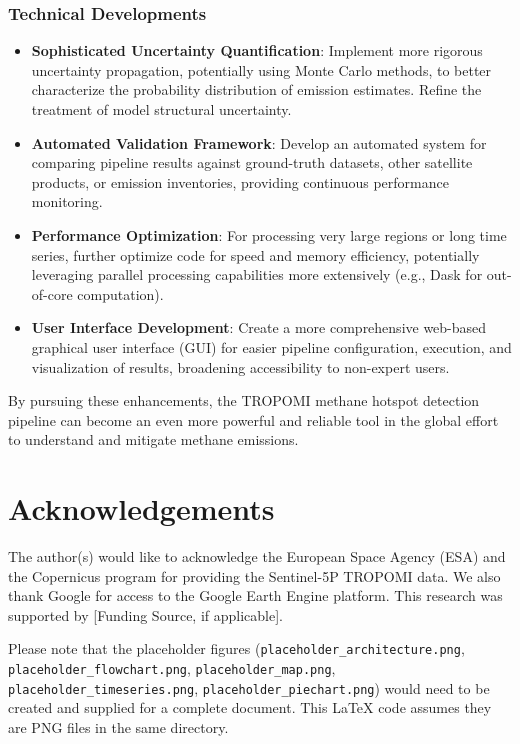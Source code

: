 \documentclass[12pt,a4paper]{article}
\begin{document}
\subsubsection{Technical Developments}
\begin{itemize}
    \item \textbf{Sophisticated Uncertainty Quantification}: Implement more rigorous uncertainty propagation, potentially using Monte Carlo methods, to better characterize the probability distribution of emission estimates. Refine the treatment of model structural uncertainty.
    \item \textbf{Automated Validation Framework}: Develop an automated system for comparing pipeline results against ground-truth datasets, other satellite products, or emission inventories, providing continuous performance monitoring.
    \item \textbf{Performance Optimization}: For processing very large regions or long time series, further optimize code for speed and memory efficiency, potentially leveraging parallel processing capabilities more extensively (e.g., Dask for out-of-core computation).
    \item \textbf{User Interface Development}: Create a more comprehensive web-based graphical user interface (GUI) for easier pipeline configuration, execution, and visualization of results, broadening accessibility to non-expert users.
\end{itemize}

By pursuing these enhancements, the TROPOMI methane hotspot detection pipeline can become an even more powerful and reliable tool in the global effort to understand and mitigate methane emissions.

\clearpage
\section*{Acknowledgements}
The author(s) would like to acknowledge the European Space Agency (ESA) and the Copernicus program for providing the Sentinel-5P TROPOMI data. We also thank Google for access to the Google Earth Engine platform. This research was supported by [Funding Source, if applicable].



 

 
  Please note that the placeholder figures (\texttt{placeholder\_architecture.png}, \texttt{placeholder\_flowchart.png}, \texttt{placeholder\_map.png}, \texttt{placeholder\_timeseries.png}, \texttt{placeholder\_piechart.png}) would need to be created and supplied for a complete document. This LaTeX code assumes they are PNG files in the same directory.
\end{document}
